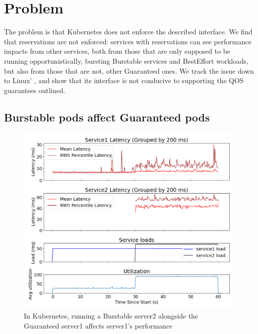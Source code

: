 \section{Problem}\label{s:problem}

The problem is that Kubernetes does not enforce the described interface. We find
that reservations are not enforced: services with reservations can see
performance impacts from other services, both from those that are only supposed
to be running opportunistically, \ie{} bursting Burstable services and
BestEffort workloads, but also from those that are not, \ie{} other Guaranteed
ones. We track the issue down to Linux' \cgroups{}, and show that its interface
is not conducive to supporting the QOS guarantees outlined.


\subsection{Burstable pods affect Guaranteed pods}

\begin{figure}[t]
    \centering
    \includegraphics[width=\columnwidth]{graphs/kubernetes-lc-burst.png}
    \caption{In Kubernetes, running a Burstable server2 alongside the Guaranteed
    server1 affects server1's performance}\label{fig:kubernetes-lc-burst}
\end{figure}

